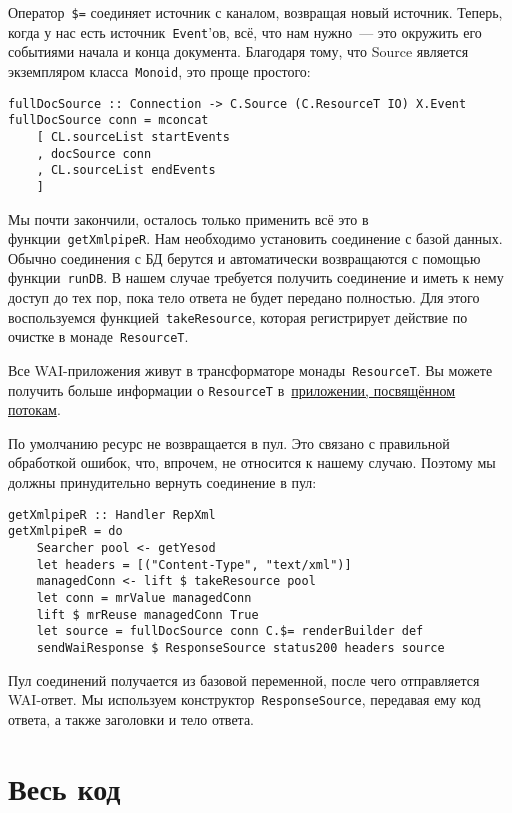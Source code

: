 Оператор~\lstinline'$=' соединяет источник с каналом, возвращая новый источник. Теперь, когда у нас есть источник~\lstinline!Event!'ов, всё, что нам нужно~--- это окружить его событиями начала и конца документа. Благодаря тому, что Source является экземпляром класса~\lstinline!Monoid!, это проще простого:
\begin{lstlisting}
fullDocSource :: Connection -> C.Source (C.ResourceT IO) X.Event
fullDocSource conn = mconcat
    [ CL.sourceList startEvents
    , docSource conn
    , CL.sourceList endEvents
    ]
\end{lstlisting}

Мы почти закончили, осталось только применить всё это в функции~\lstinline!getXmlpipeR!. Нам необходимо установить соединение с базой данных. Обычно соединения с БД берутся и автоматически возвращаются с помощью функции~\lstinline!runDB!. В нашем случае требуется получить соединение и иметь к нему доступ до тех пор, пока тело ответа не будет передано полностью. Для этого воспользуемся функцией~\lstinline!takeResource!, которая регистрирует действие по очистке в монаде~\lstinline!ResourceT!.

\begin{remark}
Все WAI-приложения живут в трансформаторе монады~\lstinline!ResourceT!. Вы можете получить больше информации о \lstinline!ResourceT! в~\hyperref[chap:conduit]{приложении, посвящённом потокам}.
\end{remark}

По умолчанию ресурс не возвращается в пул. Это связано с правильной обработкой ошибок, что, впрочем, не относится к нашему случаю. Поэтому мы должны принудительно вернуть соединение в пул:
\begin{lstlisting}
getXmlpipeR :: Handler RepXml
getXmlpipeR = do
    Searcher pool <- getYesod
    let headers = [("Content-Type", "text/xml")]
    managedConn <- lift $ takeResource pool
    let conn = mrValue managedConn
    lift $ mrReuse managedConn True
    let source = fullDocSource conn C.$= renderBuilder def
    sendWaiResponse $ ResponseSource status200 headers source
\end{lstlisting}

Пул соединений получается из базовой переменной, после чего отправляется WAI-ответ. Мы используем конструктор~\lstinline!ResponseSource!, передавая ему код ответа, а также заголовки и тело ответа.

\section{Весь код}

